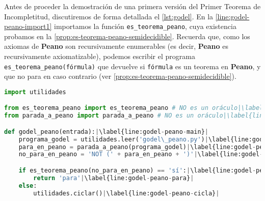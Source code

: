    


Antes de proceder la demostración de una primera versión del Primer Teorema de Incompletitud, discutiremos de forma detallada el \cref{lst:godel}. En la \cref{line:godel-peano-import1} importamos la función \texttt{es\_teorema\_peano}, cuya existencia probamos en la \cref{prop:es-teorema-peano-semidecidible}. Recuerda que, como los axiomas de \textbf{Peano} son recursivamente enumerables (es decir, \textbf{Peano} es recursivamente axiomatizable), podemos escribir el programa \texttt{es\_teorema\_peano(fórmula)} que devuelve  si \texttt{fórmula} es un teorema en \textbf{Peano}, y que no para en caso contrario (ver \cref{prop:es-teorema-peano-semidecidible}).
\vspace{8pt}
\begin{lstlisting}[language=Python, caption=\lstinline{godel_peano.py},label={lst:godel-peano}]
import utilidades

from es_teorema_peano import es_teorema_peano # NO es un oráculo|\label{line:godel-peano-import1}|
from parada_a_peano import parada_a_peano # NO es un oráculo|\label{line:godel-peano-import2}|

def godel_peano(entrada):|\label{line:godel-peano-main}|
    programa_godel = utilidades.leer('godel\_peano.py')|\label{line:godel-peano-programa}|
    para_en_peano = parada_a_peano(programa_godel)|\label{line:godel-peano-formula}|
    no_para_en_peano = 'NOT (' + para_en_peano + ')'|\label{line:godel-peano-formulaneg}|

    if es_teorema_peano(no_para_en_peano) == 'sí':|\label{line:godel-peano-es-teorema}|
        return 'para'|\label{line:godel-peano-para}|
    else:
        utilidades.ciclar()|\label{line:godel-peano-cicla}|
\end{lstlisting}

